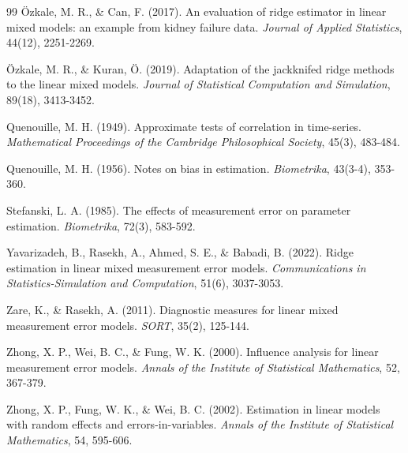 \documentclass[twoside]{article}
\begin{document}
\begin{thebibliography}{99}
Özkale, M. R., \& Can, F. (2017). An evaluation of ridge estimator in linear mixed models: an example from kidney failure data. \textit{Journal of Applied Statistics}, 44(12), 2251-2269.

Özkale, M. R., \& Kuran, Ö. (2019). Adaptation of the jackknifed ridge methods to the linear mixed models. \textit{Journal of Statistical Computation and Simulation}, 89(18), 3413-3452.

Quenouille, M. H. (1949). Approximate tests of correlation in time-series. \textit{Mathematical Proceedings of the Cambridge Philosophical Society}, 45(3), 483-484.  

Quenouille, M. H. (1956). Notes on bias in estimation. \textit{Biometrika}, 43(3-4), 353-360.

Stefanski, L. A. (1985). The effects of measurement error on parameter estimation. \textit{Biometrika}, 72(3), 583-592.

Yavarizadeh, B., Rasekh, A., Ahmed, S. E., \& Babadi, B. (2022). Ridge estimation in linear mixed measurement error models. \textit{Communications in Statistics-Simulation and Computation}, 51(6), 3037-3053.

Zare, K., \& Rasekh, A. (2011). Diagnostic measures for linear mixed measurement error models. \textit{SORT}, 35(2), 125-144.

Zhong, X. P., Wei, B. C., \& Fung, W. K. (2000). Influence analysis for linear measurement error models. \textit{Annals of the Institute of Statistical Mathematics}, 52, 367-379.

Zhong, X. P., Fung, W. K., \& Wei, B. C. (2002). Estimation in linear models with random effects and errors-in-variables. \textit{Annals of the Institute of Statistical Mathematics}, 54, 595-606.

\end{thebibliography}


 
\end{document}

